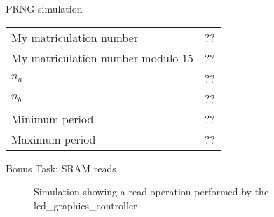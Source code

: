 \documentclass[10pt,a4paper,titlepage,oneside]{article}
\begin{document}
\begin{qa}{PRNG simulation}

\begin{center}
\begin{tabular}{ll}
\hline\hline
My matriculation number             & ?? \\
My matriculation number modulo $15$ & ?? \\
$n_a$                               & ?? \\
$n_b$                               & ?? \\
Minimum period                      & ?? \\
Maximum period                      & ?? \\\hline
\end{tabular}
\end{center}

\end{qa}

\begin{qa}{Bonus Task: SRAM reads}
\begin{figure}[h!]
	\centering
	\dummyimage
	\caption{Simulation showing a read operation performed by the \textsf{lcd\_graphics\_controller}}
\end{figure}
\end{qa}



\end{document}
